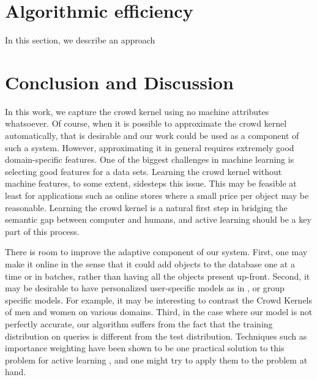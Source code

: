 \documentclass{article}
\begin{document}
\section{Algorithmic efficiency}\label{sec:efficient}

In this section, we describe an approach


\section{Conclusion and Discussion}
In this work, we capture the crowd kernel using no machine attributes whatsoever.  Of course, when it is possible to approximate the crowd kernel automatically, that is desirable and our work could be used as a component of such a system. However, approximating it in general requires extremely good domain-specific features.  One of the biggest challenges in machine learning is selecting good features for a data sets.  Learning the crowd kernel without machine features, to some extent, sidesteps this issue.  This may be feasible at least for applications such as online stores where a small price per object may be reasonable.
Learning the crowd kernel is a natural first step in bridging the semantic gap between computer and humans, and active learning should be a key part of this process.

There is room to improve the adaptive component of our system.  First, one may make it online in the sense that it could add objects to the database one at a time or in batches, rather than having all the objects present up-front.  Second, it may be desirable to have personalized user-specific models as in \cite{??}, or group specific models.  For example, it may be interesting to contrast the Crowd Kernels of men and women on various domains.  Third, in the case where our model is not perfectly accurate, our algorithm suffers from the fact that the training distribution on queries is different from the test distribution.  Techniques such as importance weighting have been shown to be one practical solution to this problem for active learning \cite{BDL09}, and one might try to apply them to the problem at hand.



\end{document}
